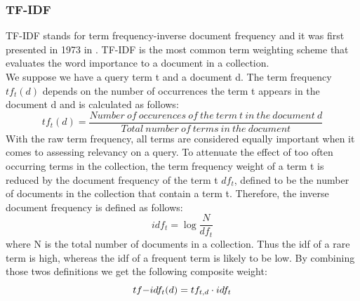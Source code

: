 \subsubsection*{TF-IDF }
TF-IDF stands for term frequency-inverse document frequency and it was first presented in 1973 in \cite{a:tfidf}. TF-IDF is the most common term weighting scheme that evaluates the word importance to a document in a collection.\\
We suppose we have a query term t and a document d. The term frequency $tf_{t}(d)$ depends on the number of occurrences the term t appears in the document d and is calculated as follows: 
	\begin{equation}
	tf_{t}(d)= \frac {Number\ of\ occurences\ of\ the\ term\ t \ in\ the\ document\ d}{Total\ number\ of\ terms\ in\ the\ document}
	\end{equation}
With the raw term frequency, all terms are considered equally important when it comes to assessing relevancy on a
query. To attenuate the effect of too often occurring terms in the collection, the term frequency weight of a term t is reduced by the document frequency of the term t $df_{t}$, defined to be the number of documents in the collection that contain a term t.
Therefore, the inverse document frequency is defined as follows:
	\begin{equation}
		idf_{t} =  \log \frac {N}{df_{t}}
	\end{equation}
where N is the total number of documents in a collection. Thus the idf of a rare term is high, whereas the idf of a frequent term is likely to be low.
By combining those twos definitions we get the following composite weight:
	\begin{equation}
		tf{\small -}idf_{t}(d)= tf_{t,d}\cdot idf_{t}
	\end{equation}
